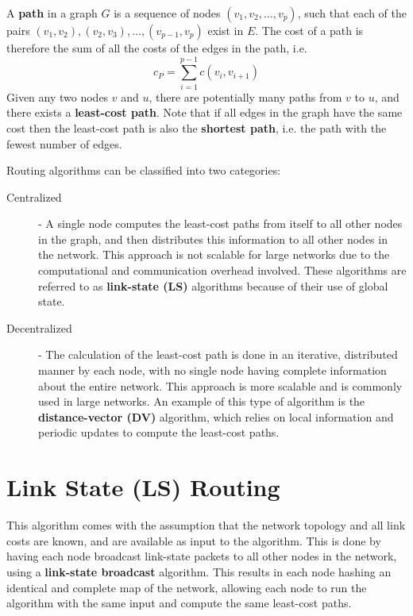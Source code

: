 \documentclass[12pt letter]{report}
\begin{document}
A \textbf{path} in a graph $G$ is a sequence of nodes $\left( v_1,
v_2, \ldots ,v_p \right) $, such that each of the pairs $\left( v_1,
v_2 \right), \left( v_2, v_3 \right), \ldots, \left( v_{p-1}, v_p
\right)   $ exist in $E$. The cost of a path is therefore the sum of
all the costs of the edges in the path, i.e.
\[
  c_P = \displaystyle\sum_{i=1}^{p-1} c \left( v_i, v_{i+1} \right)
\]
Given any two nodes $v$ and $u$, there are potentially many paths
from $v$ to $u$, and there exists a \textbf{least-cost path}. Note
that if all edges in the graph have the same cost then the least-cost
path is also the \textbf{shortest path}, i.e. the path with the
fewest number of edges.

Routing algorithms can be classified into two categories:
\begin{description}
  \item[Centralized]  - A single node computes the least-cost paths
    from itself to all
    other nodes in the graph, and then distributes this information to
    all other nodes in the network. This approach is not scalable for
    large networks due to the computational and communication overhead
    involved. These algorithms are referred to as \textbf{link-state
    (LS)} algorithms because of their use of global state.
  \item[Decentralized] - The calculation of the least-cost path is
    done in an iterative, distributed manner by each node, with no
    single node having complete information about the entire network.
    This approach is more scalable and is commonly used in large
    networks. An example of this type of algorithm is the
    \textbf{distance-vector (DV)} algorithm, which relies on local
    information and periodic updates to compute the least-cost paths.
\end{description}

\section{Link State (LS) Routing}

This algorithm comes with the assumption that the network topology
and all link costs are known, and are available as input to the
algorithm. This is done by having each node broadcast link-state
packets to all other nodes in the network, using a \textbf{link-state
broadcast} algorithm. This results in each node hashing an identical
and complete map of the network, allowing each node to run the
algorithm with the same input and compute the same least-cost paths.
\end{document}
